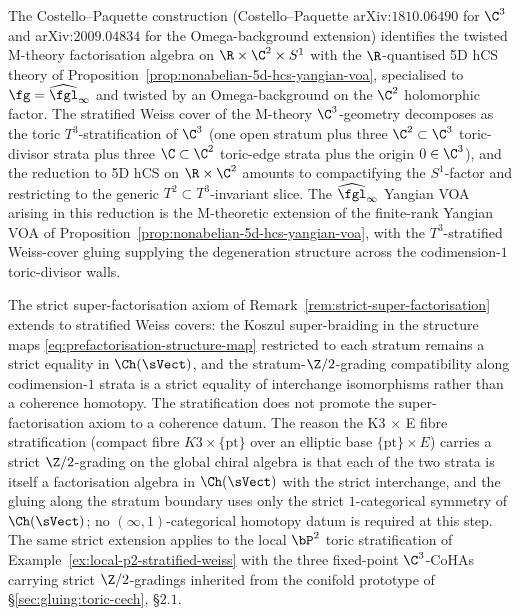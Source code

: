 \begin{remark}
\label{rem:costello-paquette-c3-m-theory}
The Costello--Paquette construction (Costello--Paquette arXiv:$1810.06490$
for $\C^3$ and arXiv:$2009.04834$ for the Omega-background extension)
identifies the twisted M-theory factorisation algebra on $\R \times
\C^2 \times S^1$ with the $\R$-quantised 5D hCS theory of
Proposition~\ref{prop:nonabelian-5d-hcs-yangian-voa}, specialised to
$\fg = \widehat{\fgl}_\infty$ and twisted by an Omega-background on
the $\C^2$ holomorphic factor. The stratified Weiss cover of the
M-theory $\C^3$-geometry decomposes as the toric $T^3$-stratification
of $\C^3$ (one open stratum plus three $\C^2 \subset \C^3$ toric-
divisor strata plus three $\C \subset \C^2$ toric-edge strata plus the
origin $0 \in \C^3$), and the reduction to 5D hCS on $\R \times \C^2$
amounts to compactifying the $S^1$-factor and restricting to the
generic $T^2 \subset T^3$-invariant slice. The $\widehat{\fgl}_\infty$
Yangian VOA arising in this reduction is the M-theoretic extension of
the finite-rank Yangian VOA of
Proposition~\ref{prop:nonabelian-5d-hcs-yangian-voa}, with the
$T^3$-stratified Weiss-cover gluing supplying the degeneration
structure across the codimension-$1$ toric-divisor walls.
\end{remark}

\begin{remark}
\label{rem:strict-super-factorisation-stratified}
The strict super-factorisation axiom of
Remark~\ref{rem:strict-super-factorisation} extends to stratified
Weiss covers: the Koszul super-braiding in the structure maps
\eqref{eq:prefactorisation-structure-map} restricted to each stratum
remains a strict equality in $\Ch(\sVect)$, and the
stratum-$\Z/2$-grading compatibility along codimension-$1$ strata is a
strict equality of interchange isomorphisms rather than a coherence
homotopy. The stratification does not promote the super-factorisation
axiom to a coherence datum. The reason the K3 $\times$ E fibre
stratification (compact fibre $K3 \times \{\mathrm{pt}\}$ over an
elliptic base $\{\mathrm{pt}\} \times E$) carries a strict
$\Z/2$-grading on the global chiral algebra is that each of the two
strata is itself a factorisation algebra in $\Ch(\sVect)$ with the
strict interchange, and the gluing along the stratum boundary uses
only the strict $1$-categorical symmetry of $\Ch(\sVect)$; no
$(\infty, 1)$-categorical homotopy datum is required at this
step. The same strict extension applies to the local $\bP^2$ toric
stratification of Example~\ref{ex:local-p2-stratified-weiss} with
the three fixed-point $\C^3$-CoHAs carrying strict $\Z/2$-gradings
inherited from the conifold prototype of \S\ref{sec:gluing:toric-cech}, \S$2.1$.
\end{remark}

